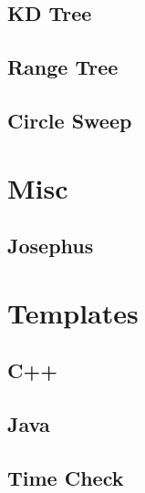 \documentclass[10pt,a4paper]{report}
\begin{document}
	\section{KD Tree}
		
	\section{Range Tree}
	\section{Circle Sweep}
	
\chapter{Misc}
	\section{Josephus}
		
\chapter{Templates}
	\section{C++}
		
	\section{Java}
	\newpage
	\section{Time Check}
		
	
\end{document}
